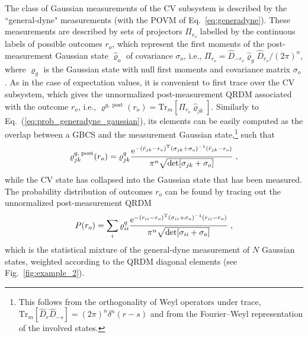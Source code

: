 \documentclass[%
reprint,
superscriptaddress,
nofootinbib,
 amsmath,amssymb,
prx,
floatfix,
]{revtex4-2}
\begin{document}
The class of Gaussian measurements of the CV subsystem is described by the ``general-dyne" measurements (with the POVM of Eq.~\ref{eq:generadyne}). These measurements are described by sets of projectors $\Pi_{r_o}$ labelled by the continuous labels of possible outcomes $r_o$, which represent the first moments of the post-measurement Gaussian state $\hat{\varrho}_o$ of covariance $\sigma_o$, i.e., $\Pi_{r_o} = \hat{D}_{-r_o} \hat{\varrho}_g \hat{D}_{r_o}/(2 \pi)^n$, where $\varrho_{g}$ is the Gaussian state with null first moments and covariance matrix $\sigma_{o}$. As in the case of expectation values, it is convenient to first trace over the CV subsystem, which gives the unnormalized post-measurement QRDM associated with the outcome $r_o$, i.e.,  $ \varrho^{q,\; \text{post}} (r_o) = \text{Tr}_m [\Pi_{r_o} \hat{\varrho}_{jk} ]$. Similarly to Eq.~(\ref{eq:prob_generadyne_gaussian}), its elements can be easily computed as the overlap between a GBCS and the measurement Gaussian state,\footnote{This follows from the orthogonality of Weyl operators under trace, $\text{Tr}_m [\hat{D}_{r} \hat{D}_{-s}] = (2 \pi)^{n} \delta^n (r - s)$ and from the Fourier--Weyl representation of the involved states.} such that
\begin{equation}
\label{eq:qubit_PMST}
    \varrho_{jk}^{q,\; \text{post}} (r_o) = \varrho^q_{jk}  \frac{{\rm e}^{ - (\bar{r}_{jk} - r_o)^{\rm T} ( \sigma_{jk} + \sigma_o )^{-1}  (\bar{r}_{jk} - r_o) }}{ \pi^n \sqrt{ \text{det} [ \sigma_{jk} + \sigma_o ] }} \;, \nonumber
\end{equation}
while the CV state has collapsed into the Gaussian state that has been measured. The probability distribution of outcomes $r_o$ can be found by tracing out the unnormalized post-measurement QRDM 
\begin{equation}
\label{eq:prob_generadyne}
    P(r_o) = \sum_{i} \varrho^q_{ii}  \frac{{\rm e}^{ - (r_{ii} - r_o)^{\rm T} ( \sigma_{ii} + \sigma_o )^{-1}  (r_{ii} - r_o) }}{\pi^n  \sqrt{ \text{det} [ \sigma_{ii} + \sigma_o ] }} \;,
\end{equation}
which is the statistical mixture of the general-dyne measurement of $N$ Gaussian states, weighted according to the QRDM diagonal elements (see Fig.~\ref{fig:example_2}).
\end{document}
